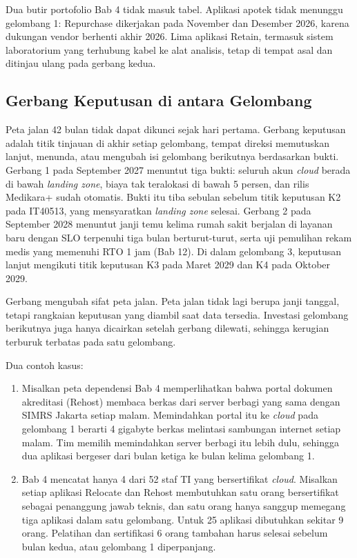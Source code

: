 Dua butir portofolio Bab 4 tidak masuk tabel. Aplikasi apotek tidak menunggu gelombang 1: Repurchase
dikerjakan pada November dan Desember 2026, karena dukungan vendor berhenti akhir 2026. Lima
aplikasi Retain, termasuk sistem laboratorium yang terhubung kabel ke alat analisis, tetap di tempat
asal dan ditinjau ulang pada gerbang kedua.

\subsection{Gerbang Keputusan di antara Gelombang}

Peta jalan 42 bulan tidak dapat dikunci sejak hari pertama. Gerbang keputusan adalah titik
tinjauan di akhir setiap gelombang, tempat direksi memutuskan lanjut, menunda, atau mengubah isi
gelombang berikutnya berdasarkan bukti. Gerbang 1 pada September 2027 menuntut tiga bukti: seluruh akun
\textit{cloud} berada di bawah \textit{landing zone}, biaya tak teralokasi di bawah 5 persen, dan
rilis Medikara+ sudah otomatis. Bukti itu tiba sebulan sebelum titik keputusan K2 pada IT40513,
yang mensyaratkan \textit{landing zone} selesai. Gerbang 2 pada September 2028 menuntut janji temu
kelima rumah sakit berjalan di layanan baru dengan SLO terpenuhi tiga bulan berturut-turut, serta uji
pemulihan rekam medis yang memenuhi RTO 1 jam (Bab 12). Di dalam gelombang 3, keputusan lanjut
mengikuti titik keputusan K3 pada Maret 2029 dan K4 pada Oktober 2029.

Gerbang mengubah sifat peta jalan. Peta jalan tidak lagi berupa janji tanggal, tetapi rangkaian
keputusan yang diambil saat data tersedia. Investasi gelombang berikutnya juga hanya dicairkan
setelah gerbang dilewati, sehingga kerugian terburuk terbatas pada satu gelombang.

Dua contoh kasus:
\begin{enumerate}
  \item Misalkan peta dependensi Bab 4 memperlihatkan bahwa portal dokumen akreditasi (Rehost)
        membaca berkas dari server berbagi yang sama dengan SIMRS Jakarta setiap malam. Memindahkan
        portal itu ke \textit{cloud} pada gelombang 1 berarti 4 gigabyte berkas melintasi
        sambungan internet setiap malam. Tim memilih memindahkan server berbagi itu lebih dulu,
        sehingga dua aplikasi bergeser dari bulan ketiga ke bulan kelima gelombang 1.
  \item Bab 4 mencatat hanya 4 dari 52 staf TI yang bersertifikat \textit{cloud}. Misalkan setiap
        aplikasi Relocate dan Rehost membutuhkan satu orang bersertifikat sebagai penanggung jawab
        teknis, dan satu orang hanya sanggup memegang tiga aplikasi dalam satu gelombang. Untuk 25
        aplikasi dibutuhkan sekitar 9 orang. Pelatihan dan sertifikasi 6 orang tambahan harus
        selesai sebelum bulan kedua, atau gelombang 1 diperpanjang.
\end{enumerate}

